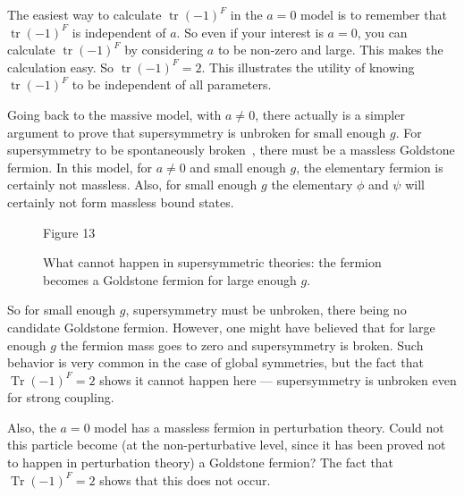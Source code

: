 \documentclass[11pt,a4paper]{article}
\begin{document}
The easiest way to calculate $\operatorname{tr}(-1)^F$ in the $a = 0$ model is to
remember that $\operatorname{tr}(-1)^F$ is independent of $a$. So even if your interest
is $a = 0$, you can calculate $\operatorname{tr}(-1)^F$ by considering $a$ to be non-zero
and large. This makes the calculation easy. So $\operatorname{tr}(-1)^F = 2$. This
illustrates the utility of knowing $\operatorname{tr}(-1)^F$ to be independent of all
parameters.

Going back to the massive model, with $a \neq 0$, there actually is
a simpler argument to prove that supersymmetry is unbroken for small
enough $g$. For supersymmetry to be spontaneously broken~\cite{ref2}, there
must be a massless Goldstone fermion. In this model, for $a \neq 0$ and
small enough $g$, the elementary fermion is certainly not massless.
Also, for small enough $g$ the elementary $\phi$ and $\psi$ will certainly not
form massless bound states.

\begin{figure}
\vspace{-0.4\baselineskip}
\centering

\par\smallskip
Figure 13

What cannot happen in supersymmetric theories: the fermion
becomes a Goldstone fermion for large enough $g$.
\vspace{-0.5\baselineskip}
\end{figure}

So for small enough $g$, supersymmetry must be unbroken, there
being no candidate Goldstone fermion. However, one might have
believed that for large enough $g$
the fermion mass goes to zero and
supersymmetry is broken. Such
behavior is very common in the
case of global symmetries, but
the fact that $\operatorname{Tr}(-1)^F = 2$ shows
it cannot happen here --- supersymmetry is unbroken even for
strong coupling.

Also, the $a = 0$ model has a
massless fermion in perturbation
theory. Could not this particle become (at the non-perturbative
level, since it has been proved not to happen in perturbation theory)
a Goldstone fermion? The fact that $\operatorname{Tr}(-1)^F = 2$ shows that this does
not occur.
\end{document}

